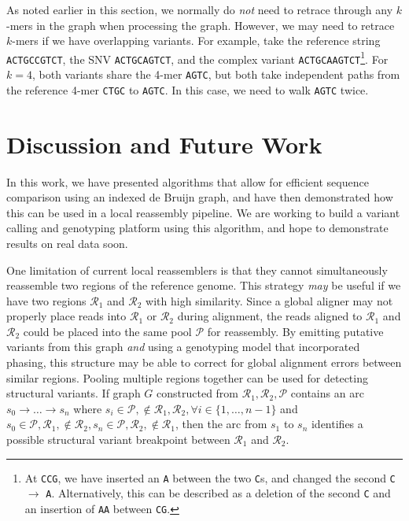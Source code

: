 \documentclass[11pt]{article}
\begin{document}
As noted earlier in this section, we normally do \emph{not} need to retrace through any $k$-mers in the
graph when processing the graph. However, we may need to retrace $k$-mers if we have overlapping
variants. For example, take the reference string \texttt{ACTGCCGTCT}, the SNV \texttt{ACTGCAGTCT},
and the complex variant \texttt{ACTGCAAGTCT}\footnote{At \texttt{CCG}, we have inserted an \texttt{A}
between the two \texttt{C}s, and changed the second \texttt{C} $\rightarrow$ \texttt{A}. Alternatively, this
can be described as a deletion of the second \texttt{C} and an insertion of \texttt{AA} between
\texttt{CG}.}. For $k = 4$, both variants share the 4-mer \texttt{AGTC}, but both take independent paths
from the reference 4-mer \texttt{CTGC} to \texttt{AGTC}. In this case, we need to walk \texttt{AGTC} twice.

\section{Discussion and Future Work}
\label{sec:discussion}

In this work, we have presented algorithms that allow for efficient sequence comparison using an indexed
de Bruijn graph, and have then demonstrated how this can be used in a local reassembly pipeline. We are
working to build a variant calling and genotyping platform using this algorithm, and hope to demonstrate
results on real data soon.

One limitation of current local reassemblers is that they cannot simultaneously reassemble two regions
of the reference genome. This strategy \emph{may} be useful if we have two regions $\mathcal{R}_1$ and
$\mathcal{R}_2$ with high similarity. Since a global aligner may not properly place reads into
$\mathcal{R}_1$ or $\mathcal{R}_2$ during alignment, the reads aligned to $\mathcal{R}_1$ and
$\mathcal{R}_2$ could be placed into the same pool $\mathcal{P}$ for reassembly. By emitting putative
variants from this graph \emph{and} using a genotyping model that incorporated phasing, this structure
may be able to correct for global alignment errors between similar regions. Pooling multiple regions
together can be used for detecting structural variants. If graph $G$ constructed from $\mathcal{R}_1,
\mathcal{R}_2, \mathcal{P}$ contains an arc $s_0 \rightarrow \dots \rightarrow s_n$ where $s_i \in
\mathcal{P}, \not\in \mathcal{R}_1, \mathcal{R}_2, \forall i \in \{1, \dots, n - 1\}$ and $s_0 \in \mathcal{P},
\mathcal{R}_1, \not\in \mathcal{R}_2, s_n \in \mathcal{P}, \mathcal{R}_2, \not\in \mathcal{R}_1$, then the
arc from $s_1$ to $s_n$ identifies a possible structural variant breakpoint between $\mathcal{R}_1$ and
$\mathcal{R}_2$.
\end{document}
